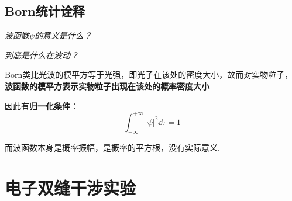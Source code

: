 \subsection{Born统计诠释}
\begin{center}
    \textit{波函数$\psi$的意义是什么？}
    
    \textit{到底是什么在波动？}
\end{center}

Born类比光波的模平方等于光强，即光子在该处的密度大小，故而对实物粒子，\textbf{波函数的模平方表示实物粒子出现在该处的概率密度大小}

因此有\textbf{归一化条件}：
\[\int_{-\infty }^{+\infty}|\psi|^2 \dd{\tau } = 1\]

而波函数本身是概率振幅，是概率的平方根，没有实际意义.

\section{电子双缝干涉实验}
